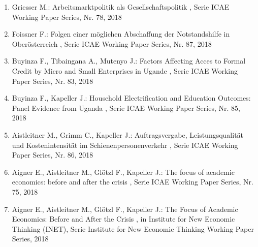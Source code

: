 \begin{enumerate}[leftmargin=*, labelsep=0.5cm]
	 \item Griesser M.:  Arbeitsmarktpolitik als Gesellschaftspolitik  , Serie ICAE Working Paper Series, Nr. 78, 2018
	 \item Foissner F.:  Folgen einer möglichen Abschaffung der Notstandshilfe in Oberösterreich  , Serie ICAE Working Paper Series, Nr. 87, 2018
	 \item Buyinza F., Tibaingana A., Mutenyo J.:  Factors Affecting Acces to Formal Credit by Micro and Small Enterprises in Ugande  , Serie ICAE Working Paper Series, Nr. 83, 2018
	 \item Buyinza F., Kapeller J.:  Household Electrification and Education Outcomes: Panel Evidence from Uganda  , Serie ICAE Working Paper Series, Nr. 85, 2018
	 \item Aistleitner M., Grimm C., Kapeller J.:  Auftragsvergabe, Leistungsqualität und Kostenintensität im Schienenpersonenverkehr  , Serie ICAE Working Paper Series, Nr. 86, 2018
	 \item Aigner E., Aistleitner M., Glötzl F., Kapeller J.:  The focus of academic economics: before and after the crisis  , Serie ICAE Working Paper Series, Nr. 75, 2018
	 \item Aigner E., Aistleitner M., Glötzl F., Kapeller J.:  The Focus of Academic Economics: Before and After the Crisis  , in Institute for New Economic Thinking (INET), Serie Institute for New Economic Thinking  Working Paper Series, 2018
\end{enumerate} 
